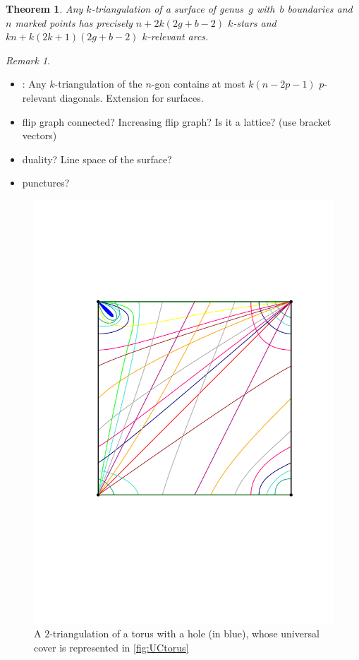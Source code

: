 \documentclass{amsart}
\newtheorem{theorem}{Theorem}[section]
\theoremstyle{remark}
\newtheorem{remark}{Remark}[section]
\newcommand*{\ktg}[0]{$k$-triangulation\xspace}
\begin{document}
\begin{theorem}
\label{thm:structureSurface}
Any \ktg of a surface of genus~$g$ with~$b$ boundaries and~$n$ marked points has precisely $n + 2k(2g + b - 2)$ $k$-stars and $kn + k(2k + 1)(2g + b - 2)$ $k$-relevant arcs.
\end{theorem}


\begin{remark}
\begin{itemize}
\item \cite[Lem.~7.10]{PilaudSantos}: Any $k$-triangulation of the $n$-gon contains at most $k(n-2p-1)$ $p$-relevant diagonals. Extension for surfaces.
\item flip graph connected? Increasing flip graph? Is it a lattice? (use bracket vectors)
\item duality? Line space of the surface?
\item punctures?
\end{itemize}
\end{remark}


\begin{figure}[h]
	\capstart
	\centerline{\includegraphics[scale=.42]{exTorusSquare}}
	\caption{A $2$-triangulation of a torus with a hole (in blue), whose universal cover is represented in \cref{fig:UCtorus}}
	\label{fig:torus}
\end{figure}
\end{document}
